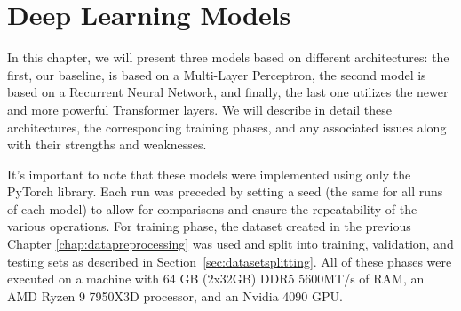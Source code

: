\chapter{Deep Learning Models}
In this chapter, we will present three models based on
different architectures: the first, our baseline, is based on a
Multi-Layer Perceptron, the second model is based on a Recurrent Neural Network, and finally,
the last one utilizes the newer and more powerful Transformer layers.
We will describe in detail these architectures, the corresponding training phases,
and any associated issues along with their strengths and weaknesses.

It's important to note that these models were implemented using only
the PyTorch \cite{pytorch} library.
Each run was preceded by setting a seed (the same for all runs of each model)
to allow for comparisons and ensure the repeatability of the
various operations. For training phase, the dataset created in the
previous Chapter \ref{chap:datapreprocessing} was used and split
into training, validation, and testing sets as described in Section~\ref{sec:datasetsplitting}.
All of these phases were executed on a machine with 64 GB (2x32GB) DDR5 5600MT/s of RAM,
an AMD Ryzen 9 7950X3D processor, and an Nvidia 4090 GPU.
%
%


